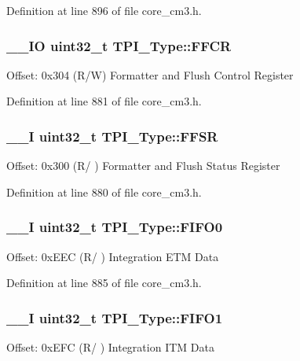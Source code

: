 Definition at line 896 of file core\-\_\-cm3.\-h.

\hypertarget{struct_t_p_i___type_a3eb42d69922e340037692424a69da880}{
\subsubsection[{F\-F\-C\-R}]{\setlength{\rightskip}{0pt plus 5cm}\-\_\-\-\_\-\-I\-O {\bf uint32\-\_\-t} T\-P\-I\-\_\-\-Type\-::\-F\-F\-C\-R}}\label{struct_t_p_i___type_a3eb42d69922e340037692424a69da880}
Offset\-: 0x304 (R/\-W) Formatter and Flush Control Register 

Definition at line 881 of file core\-\_\-cm3.\-h.

\hypertarget{struct_t_p_i___type_ae67849b2c1016fe6ef9095827d16cddd}{
\subsubsection[{F\-F\-S\-R}]{\setlength{\rightskip}{0pt plus 5cm}\-\_\-\-\_\-\-I {\bf uint32\-\_\-t} T\-P\-I\-\_\-\-Type\-::\-F\-F\-S\-R}}\label{struct_t_p_i___type_ae67849b2c1016fe6ef9095827d16cddd}
Offset\-: 0x300 (R/ ) Formatter and Flush Status Register 

Definition at line 880 of file core\-\_\-cm3.\-h.

\hypertarget{struct_t_p_i___type_ae91ff529e87d8e234343ed31bcdc4f10}{
\subsubsection[{F\-I\-F\-O0}]{\setlength{\rightskip}{0pt plus 5cm}\-\_\-\-\_\-\-I {\bf uint32\-\_\-t} T\-P\-I\-\_\-\-Type\-::\-F\-I\-F\-O0}}\label{struct_t_p_i___type_ae91ff529e87d8e234343ed31bcdc4f10}
Offset\-: 0x\-E\-E\-C (R/ ) Integration E\-T\-M Data 

Definition at line 885 of file core\-\_\-cm3.\-h.

\hypertarget{struct_t_p_i___type_aebaa9b8dd27f8017dd4f92ecf32bac8e}{
\subsubsection[{F\-I\-F\-O1}]{\setlength{\rightskip}{0pt plus 5cm}\-\_\-\-\_\-\-I {\bf uint32\-\_\-t} T\-P\-I\-\_\-\-Type\-::\-F\-I\-F\-O1}}\label{struct_t_p_i___type_aebaa9b8dd27f8017dd4f92ecf32bac8e}
Offset\-: 0x\-E\-F\-C (R/ ) Integration I\-T\-M Data 

